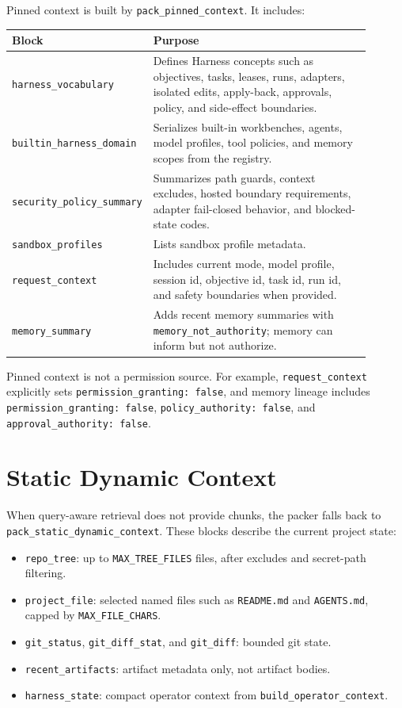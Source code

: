 \documentclass[11pt]{article}
\begin{document}
Pinned context is built by \texttt{pack\_pinned\_context}. It includes:

\begin{longtable}{p{0.28\linewidth}p{0.62\linewidth}}
\toprule
\textbf{Block} & \textbf{Purpose} \\
\midrule
\texttt{harness\_vocabulary} & Defines Harness concepts such as objectives, tasks, leases, runs, adapters, isolated edits, apply-back, approvals, policy, and side-effect boundaries. \\
\texttt{builtin\_harness\_domain} & Serializes built-in workbenches, agents, model profiles, tool policies, and memory scopes from the registry. \\
\texttt{security\_policy\_summary} & Summarizes path guards, context excludes, hosted boundary requirements, adapter fail-closed behavior, and blocked-state codes. \\
\texttt{sandbox\_profiles} & Lists sandbox profile metadata. \\
\texttt{request\_context} & Includes current mode, model profile, session id, objective id, task id, run id, and safety boundaries when provided. \\
\texttt{memory\_summary} & Adds recent memory summaries with \texttt{memory\_not\_authority}; memory can inform but not authorize. \\
\bottomrule
\end{longtable}

Pinned context is not a permission source. For example, \texttt{request\_context} explicitly sets \texttt{permission\_granting: false}, and memory lineage includes \texttt{permission\_granting: false}, \texttt{policy\_authority: false}, and \texttt{approval\_authority: false}.

\section{Static Dynamic Context}

When query-aware retrieval does not provide chunks, the packer falls back to \texttt{pack\_static\_dynamic\_context}. These blocks describe the current project state:

\begin{itemize}[leftmargin=*]
  \item \texttt{repo\_tree}: up to \texttt{MAX\_TREE\_FILES} files, after excludes and secret-path filtering.
  \item \texttt{project\_file}: selected named files such as \texttt{README.md} and \texttt{AGENTS.md}, capped by \texttt{MAX\_FILE\_CHARS}.
  \item \texttt{git\_status}, \texttt{git\_diff\_stat}, and \texttt{git\_diff}: bounded git state.
  \item \texttt{recent\_artifacts}: artifact metadata only, not artifact bodies.
  \item \texttt{harness\_state}: compact operator context from \texttt{build\_operator\_context}.
\end{itemize}
\end{document}
